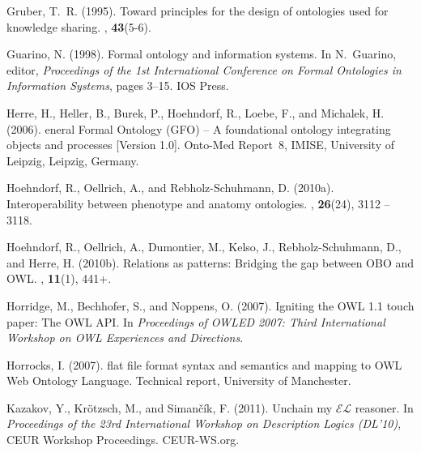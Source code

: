 \documentclass{bioinfo}
\begin{document}
\begin{thebibliography}{}
Gruber, T.~R. (1995).
\newblock Toward principles for the design of ontologies used for knowledge
  sharing.
, {\bf
  43}(5-6).

Guarino, N. (1998).
\newblock Formal ontology and information systems.
\newblock In N.~Guarino, editor, {\em Proceedings of the 1st International
  Conference on Formal Ontologies in Information Systems\/}, pages 3--15. IOS
  Press.

Herre, H., Heller, B., Burek, P., Hoehndorf, R., Loebe, F., and Michalek, H.
  (2006).
eneral {F}ormal {O}ntology ({GFO}) -- {A} foundational ontology
  integrating objects and processes [{V}ersion 1.0].
\newblock Onto-Med Report~8, IMISE, University of Leipzig, Leipzig, Germany.

Hoehndorf, R., Oellrich, A., and Rebholz-Schuhmann, D. (2010a).
\newblock Interoperability between phenotype and anatomy ontologies.
, {\bf 26}(24), 3112 -- 3118.

Hoehndorf, R., Oellrich, A., Dumontier, M., Kelso, J., Rebholz-Schuhmann, D.,
  and Herre, H. (2010b).
\newblock Relations as patterns: Bridging the gap between {OBO} and {OWL}.
, {\bf 11}(1), 441+.

Horridge, M., Bechhofer, S., and Noppens, O. (2007).
\newblock Igniting the {OWL} 1.1 touch paper: The {OWL} {API}.
\newblock In {\em Proceedings of OWLED 2007: Third International Workshop on
  OWL Experiences and Directions\/}.

Horrocks, I. (2007).
 flat file format syntax and semantics and mapping to {OWL}
  {W}eb {O}ntology {L}anguage.
\newblock Technical report, University of Manchester.

Kazakov, Y., Kr{\"o}tzsch, M., and Siman\v{c}\'{i}k, F. (2011).
\newblock Unchain my $\mathcal{EL}$ reasoner.
\newblock In {\em Proceedings of the 23rd International Workshop on Description
  Logics (DL'10)\/}, CEUR Workshop Proceedings. CEUR-WS.org.


\end{thebibliography}
\end{document}
